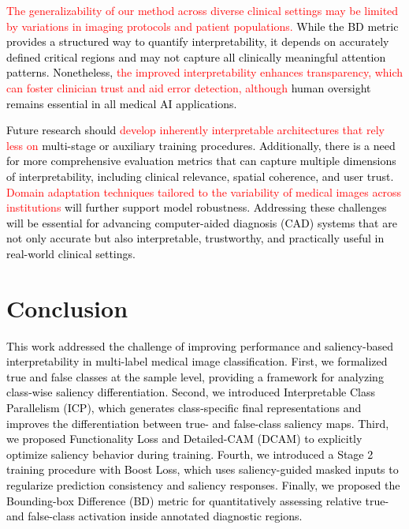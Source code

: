 \documentclass[preprint,7pt, a4paper]{elsarticle}
\begin{document}
\textcolor{black}{\textcolor{red}{The generalizability of our method across diverse clinical settings may be limited by variations in imaging protocols and patient populations.} While the BD metric provides a structured way to quantify interpretability, it depends on accurately defined critical regions and may not capture all clinically meaningful attention patterns. Nonetheless, \textcolor{red}{the improved interpretability enhances transparency, which can foster clinician trust and aid error detection, although} human oversight remains essential in all medical AI applications.}

\textcolor{black}{Future research should \textcolor{red}{develop inherently interpretable architectures that rely less on} multi-stage or auxiliary training procedures. Additionally, there is a need for more comprehensive evaluation metrics that can capture multiple dimensions of interpretability, including clinical relevance, spatial coherence, and user trust. \textcolor{red}{Domain adaptation techniques tailored to the variability of medical images across institutions} will further support model robustness. Addressing these challenges will be essential for advancing computer-aided diagnosis (CAD) systems that are not only accurate but also interpretable, trustworthy, and practically useful in real-world clinical settings.
}


\section{Conclusion}

\textcolor{black}{This work addressed the challenge of improving performance and saliency-based interpretability in multi-label medical image classification. First, we formalized true and false classes at the sample level, providing a framework for analyzing class-wise saliency differentiation. Second, we introduced Interpretable Class Parallelism (ICP), which generates class-specific final representations and improves the differentiation between true- and false-class saliency maps. Third, we proposed Functionality Loss and Detailed-CAM (DCAM) to explicitly optimize saliency behavior during training. Fourth, we introduced a Stage 2 training procedure with Boost Loss, which uses saliency-guided masked inputs to regularize prediction consistency and saliency responses. Finally, we proposed the Bounding-box Difference (BD) metric for quantitatively assessing relative true- and false-class activation inside annotated diagnostic regions.}
\end{document}
